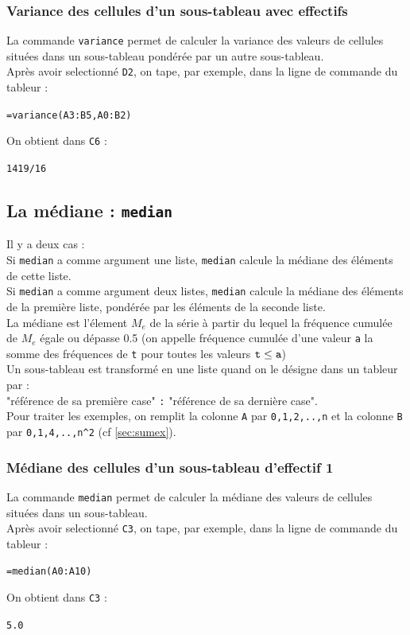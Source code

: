 \documentclass[a4paper,11pt]{book}
\begin{document}
\subsubsection{Variance des cellules d'un sous-tableau avec effectifs}
La commande {\tt variance} permet de calculer la variance des valeurs de
 cellules
 situ\'ees dans un sous-tableau pond\'er\'ee par un autre sous-tableau.\\ 
Apr\`es avoir selectionn\'e {\tt D2}, on tape, par exemple, dans la ligne de 
commande du tableur :
\begin{center}{\tt =variance(A3:B5,A0:B2)}\end{center}
On obtient dans {\tt C6} :
\begin{center}{\tt 1419/16 }\end{center}
\subsection{La m\'ediane : {\tt median}}
Il y a deux cas :\\
Si {\tt median} a comme argument une liste, {\tt median} calcule la 
m\'ediane des \'el\'ements de cette liste.\\
Si {\tt median} a comme argument deux listes, {\tt median} calcule la 
m\'ediane des \'el\'ements de la  premi\`ere liste, pond\'er\'ee par les 
\'el\'ements de la seconde liste.\\
 La m\'ediane est l'\'element $M_e$ de la s\'erie
\`a partir du lequel la fr\'equence cumul\'ee de $M_e$ \'egale ou d\'epasse 
0.5 (on appelle fr\'equence cumul\'ee d'une valeur {\tt a} la somme des 
fr\'equences de {\tt t} pour toutes les valeurs ${\tt t \leq  a}$)\\
Un sous-tableau est transform\'e en une liste quand on le d\'esigne dans 
un tableur par :\\ 
"r\'ef\'erence de sa premi\`ere case" {\tt :}  
"r\'ef\'erence de sa derni\`ere case".\\
Pour traiter les exemples,  on remplit la colonne {\tt A} par 
{\tt 0,1,2,..,n} et la colonne 
{\tt B} par {\tt 0,1,4,..,n\verb|^|2} (cf \ref{sec:sumex}).
\subsubsection{M\'ediane des cellules d'un sous-tableau d'effectif 1}
La commande {\tt median} permet de calculer la m\'ediane des valeurs de
cellules situ\'ees dans un sous-tableau.\\ 
Apr\`es avoir selectionn\'e {\tt C3}, on tape, par exemple, dans la ligne de 
commande du tableur :
\begin{center}{\tt =median(A0:A10)}\end{center}
On obtient dans {\tt C3} :
\begin{center}{\tt 5.0}\end{center}
\end{document}
